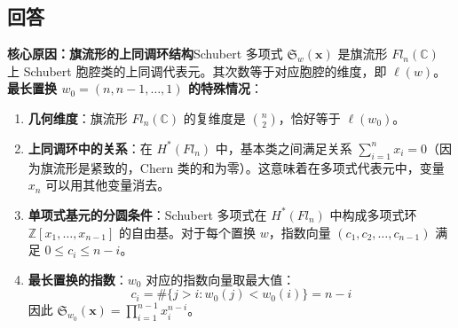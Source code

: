 \subsection{回答}
\textbf{核心原因：旗流形的上同调环结构}Schubert 多项式 $\mathfrak{S}_w(\mathbf{x})$ 是旗流形 $Fl_n(\mathbb{C})$ 上 Schubert 胞腔类的上同调代表元。其次数等于对应胞腔的维度，即 $\ell(w)$。\textbf{最长置换 $w_0 = (n, n-1, \ldots, 1)$ 的特殊情况}：
\begin{sloppypar}
\begin{enumerate}
\item \textbf{几何维度}：旗流形 $Fl_n(\mathbb{C})$ 的复维度是 $\binom{n}{2}$，恰好等于 $\ell(w_0)$。\item \textbf{上同调环中的关系}：在 $H^*(Fl_n)$ 中，基本类之间满足关系 $\sum_{i=1}^n x_i = 0$（因为旗流形是紧致的，Chern 类的和为零）。这意味着在多项式代表元中，变量 $x_n$ 可以用其他变量消去。\item \textbf{单项式基元的分圆条件}：Schubert 多项式在 $H^*(Fl_n)$ 中构成多项式环 $\mathbb{Z}[x_1, \ldots, x_{n-1}]$ 的自由基。对于每个置换 $w$，指数向量 $(c_1, c_2, \ldots, c_{n-1})$ 满足 $0 \leq c_i \leq n-i$。\item \textbf{最长置换的指数}：$w_0$ 对应的指数向量取最大值：$$c_i = \#\{j > i : w_0(j) < w_0(i)\} = n-i$$因此 $\mathfrak{S}_{w_0}(\mathbf{x}) = \prod_{i=1}^{n-1} x_i^{n-i}$。
\end{enumerate}
\end{sloppypar}

